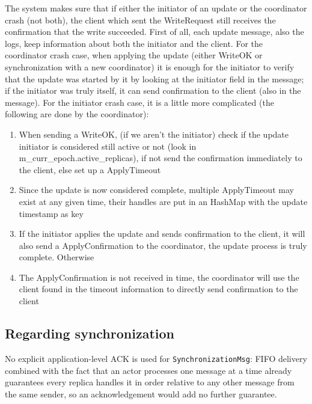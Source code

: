 The system makes sure that if either the initiator of an update or the coordinator crash (not both), the client which sent the WriteRequest still receives the confirmation that the write succeeded. First of all, each update message, also the logs, keep information about both the initiator and the client. 
For the coordinator crash case, when applying the update (either WriteOK or synchronization with a new coordinator) it is enough for the initiator to verify that the update was started by it by looking at the initiator field in the message; if the initiator was truly itself, it can send confirmation to the client (also in the message). For the initiator crash case, it is a little more complicated (the following are done by the coordinator):
\begin{enumerate}
    \item When sending a WriteOK, (if we aren't the initiator) check if the update initiator is considered still active or not
    (look in m\_curr\_epoch.active\_replicas), if not send the confirmation immediately to the client, else set up a ApplyTimeout
    \item Since the update is now considered complete, multiple ApplyTimeout may exist at any given time, their handles are put in an HashMap with the update timestamp as key
    \item If the initiator applies the update and sends confirmation to the client, it will also send a ApplyConfirmation to the coordinator, the update process is truly complete. Otherwise
    \item The ApplyConfirmation is not received in time, the coordinator will use the client found in the timeout information to directly send confirmation to the client
\end{enumerate}

\subsection{Regarding synchronization}

No explicit application-level ACK is used for \texttt{SynchronizationMsg}: FIFO delivery
combined with the fact that an actor processes one message at a time already guarantees every
replica handles it in order relative to any other message from the same sender, so an
acknowledgement would add no further guarantee.